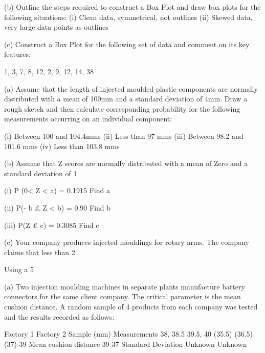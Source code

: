 (b)	Outline the steps required to construct a Box Plot and draw box plots for the following situations:
(i)	Clean data, symmetrical, not outlines
(ii)	Skewed data, very large data points as outlines

(c)	Construct a Box Plot for the following set of data and comment on its key features:

1, 3, 7, 8, 12, 2, 9, 12, 14, 38



(a)	Assume that the length of injected moulded plastic components are normally distributed with a mean of 100mm and a standard deviation of 4mm.  Draw a rough sketch and then calculate corresponding probability for the following measurements occurring on an individual component:
 
(i)	Between 100 and 104.4mms
(ii)	Less than 97 mms
(iii)	Between 98.2 and 101.6 mms
(iv)	Less than 103.8 mms


(b)	Assume that Z scores are normally distributed with a mean of Zero and a
 	standard deviation of 1
 
(i) 	P (0< Z < a)  =  0.1915 			 Find   a 

(ii)            P(- b £ Z < b) =  0.90		            	 Find   b

     	(iii)             P(Z £ c)  =       0.3085 			 Find   c


(c)	Your company produces injected mouldings for rotary arms. The company claims that less than 2%

Using a 5%


(a) 	Two injection moulding machines in separate plants manufacture battery
connectors for the same client company.  The critical parameter is the mean cushion distance.  A random sample of 4 products from each company was tested and the results recorded as follows:

	Factory 1	Factory 2
Sample (mm) Measurements	38,     38.5
39.5,  40	(35.5)  (36.5)
(37)     39
Mean cushion distance	39	37
Standard Deviation	Unknown	Unknown


